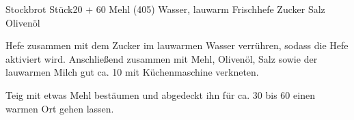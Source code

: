 \begin{MyRecipe}{Stockbrot}{ Stück}{\SI{20}{\minuteprime} + \SI{60}{\minuteprime}}
	\ingredient[\Calc{500}{\x}]{\si{\gram}} {Mehl (405)}
	\ingredient[\Calc{0.25}{\x}]{\si{\liter}} {Wasser, lauwarm}
	\ingredient[0.5]{} {Frischhefe}
	\ingredient[\Calc{2}{\x}]{\si{\Teeloeffel}} {Zucker}
	\ingredient[\Calc{2}{\x}]{\si{\Teeloeffel}} {Salz}
	\ingredient[\Calc{1}{\x}]{\si{\Essloeffel}} {Olivenöl}
	
	Hefe zusammen mit dem Zucker im lauwarmen Wasser verrühren, sodass die Hefe aktiviert wird. Anschließend zusammen mit Mehl, Olivenöl, Salz sowie der lauwarmen Milch gut ca. \SI{10}{\minuteprime} mit Küchenmaschine verkneten.\par\bigskip
	
	Teig mit etwas Mehl bestäumen und abgedeckt ihn für ca. \SI{30}{\minuteprime} bis \SI{60}{\minuteprime} einen warmen Ort gehen lassen.
	
	
\end{MyRecipe}
